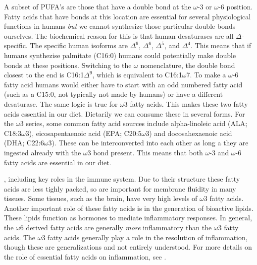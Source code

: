 \documentclass{tufte-handout}
\begin{document}
A subset of PUFA's are those that have a double bond at the $\omega$-3 or $\omega$-6 position.  Fatty acids that have bonds at this location are essential for several physiological functions in humans \emph{but} we cannot synthesize those particular double bonds ourselves.  The biochemical reason for this is that human desaturases are all $\Delta$-specific.  The specific human isoforms are $\Delta^9$, $\Delta^6$, $\Delta^5$, and $\Delta^4$.  This means that if humans synthezise palmitate (C16:0) humans could potentially make double bonds at these positions.  Switching to the $\omega$ nomenclature, the double bond closest to the end is C16:1$\Delta^9$, which is equivalent to C16:1$\omega$7.  To make a $\omega$-6 fatty acid humans would either have to start with an odd numbered fatty acid (such as a C15:0, not typically not made by humans) or have a different desaturase.  The same logic is true for $\omega$3 fatty acids.  This makes these two fatty acids essential in our diet.  Dietarily we can consume these in several forms.  For the $\omega$3 series, some common fatty acid sources include alpha-linoleic acid (ALA; C18:3$\omega$3), eicosapentaenoic acid (EPA; C20:5$\omega$3) and docosahexaenoic acid (DHA; C22:6$\omega$3).  These can be interconverted into each other as long a they are ingested already with the $\omega$3 bond present.  This means that both $\omega$-3  and $\omega$-6 fatty acids are essential in our diet.

, including key roles in the immune system.  Due to their structure these fatty acids are less tighly packed, so are important for membrane fluidity in many tissues.  Some tissues, such as the brain, have very high levels of $\omega$3 fatty acids.  Another important role of these fatty acids is in the generation of bioactive lipids.  These lipids function as hormones to mediate inflammatory responses.  In general, the $\omega$6 derived fatty acids are generally \emph{more} inflammatory than the $\omega$3 fatty acids.  The $\omega$3 fatty acids generally play a role in the resolution of inflammation, though these are generalizations and not entirely understood.  For more details on the role of essential fatty acids on inflammation, see \citet{Calder2013}.  
\end{document}
